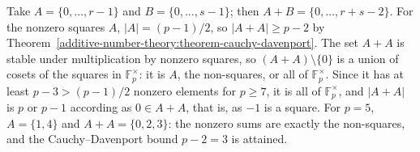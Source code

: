 \begin{solution}
Take $A = \{0, \ldots, r - 1\}$ and $B = \{0, \ldots, s - 1\}$; then $A + B = \{0, \ldots, r + s - 2\}$. For the nonzero squares $A$, $|A| = (p - 1)/2$, so $|A + A| \geq p - 2$ by
Theorem~\ref{additive-number-theory:theorem-cauchy-davenport}. The set $A + A$ is stable under multiplication by nonzero squares, so $(A + A) \setminus \{0\}$ is a union of cosets of the squares in $\mathbb{F}_p^\times$: it is $A$,
the non-squares, or all of $\mathbb{F}_p^\times$. Since it has at least $p - 3 > (p - 1)/2$ nonzero elements for $p \geq 7$, it is all of $\mathbb{F}_p^\times$, and $|A + A|$ is $p$ or $p - 1$ according as $0 \in A + A$,
that is, as $-1$ is a square. For $p = 5$, $A = \{1, 4\}$ and $A + A = \{0, 2, 3\}$: the nonzero sums are exactly the non-squares, and the Cauchy--Davenport bound $p - 2 = 3$ is attained.
\end{solution}
